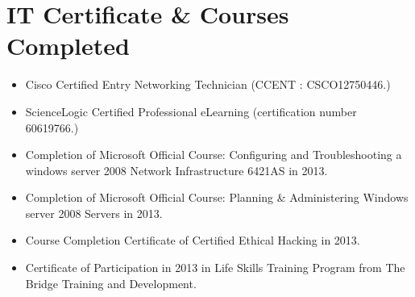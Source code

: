 \documentclass[letterpaper, 12pt]{article}
\begin{document}
	\section{IT Certificate \& Courses Completed}
		\begin{itemize}[noitemsep]
			\item {Cisco Certified Entry Networking Technician (CCENT : CSCO12750446.)}
			\item {ScienceLogic Certified Professional eLearning (certification number 60619766.)}
			\item {Completion of Microsoft Official Course: Configuring and Troubleshooting a windows server 2008 Network Infrastructure 6421AS in 2013.}
			\item {Completion of Microsoft Official Course: Planning \& Administering Windows server 2008 Servers in 2013.}
			\item {Course Completion Certificate of Certified Ethical Hacking in 2013.}
			\item {Certificate of Participation in 2013 in Life Skills Training Program from The Bridge Training and Development.}
		\end{itemize}
		
		
		
\end{document}
